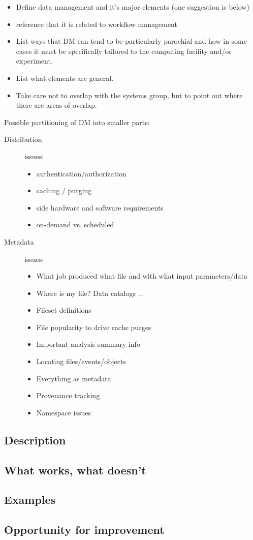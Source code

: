 
\begin{itemize}
\item Define data management and it's major elements (one suggestion is below)
\item reference that it is related to workflow management
\item List ways that DM can tend to be particularly parochial and how in some cases it must be specifically tailored to the computing facility and/or experiment.
\item List what elements are general.
\item Take care not to overlap with the systems group, but to point out where there are areas of overlap.
\end{itemize}
Possible partitioning of DM into smaller parts:
\begin{description}
\item[Distribution] issues:
  \begin{itemize}
  \item authentication/authorization
  \item caching / purging
  \item side hardware and software requirements
  \item on-demand vs. scheduled
  \end{itemize}
\item[Metadata] issues:
  \begin{itemize}
  \item What job produced what file and with what input parameters/data
  \item Where is my file? Data catalogs ...
  \item Fileset definitions
  \item File popularity to drive cache purges
  \item Important analysis summary info
  \item Locating files/events/objects
  \item Everything as metadata
  \item Provenance tracking
  \item Namespace issues
  \end{itemize}
\end{description}



\subsection{Description}
\subsection{What works, what doesn't}
\subsection{Examples}
\subsection{Opportunity for improvement}
